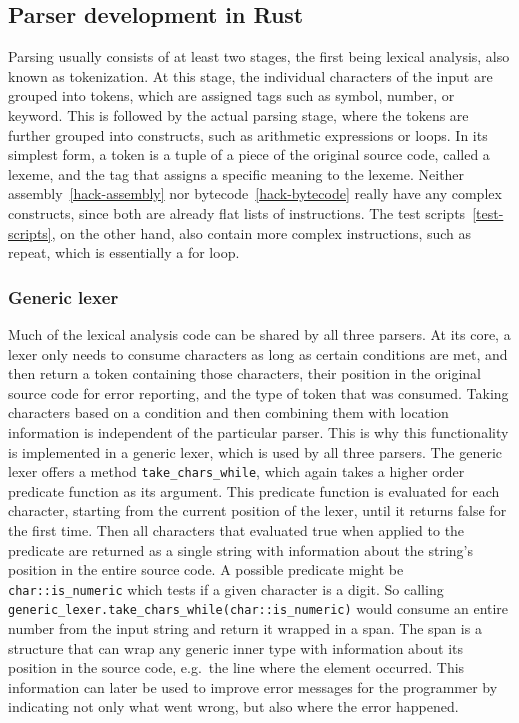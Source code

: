 \subsection{Parser development in Rust} \label{parser-dev}
Parsing usually consists of at least two stages, the first being lexical analysis, also known as tokenization.
At this stage, the individual characters of the input are grouped into tokens, which are assigned tags such as symbol, number, or keyword.
This is followed by the actual parsing stage, where the tokens are further grouped into constructs, such as arithmetic expressions or loops.
In its simplest form, a token is a tuple of a piece of the original source code, called a lexeme, and the tag that assigns a specific meaning to the lexeme.
Neither assembly~\ref{hack-assembly} nor bytecode~\ref{hack-bytecode} really have any complex constructs, since both are already flat lists of instructions.
The test scripts~\ref{test-scripts}, on the other hand, also contain more complex instructions, such as repeat, which is essentially a for loop.

\subsubsection{Generic lexer}
Much of the lexical analysis code can be shared by all three parsers.
At its core, a lexer only needs to consume characters as long as certain conditions are met, and then return a token containing those characters, their position in the original source code for error reporting, and the type of token that was consumed.
Taking characters based on a condition and then combining them with location information is independent of the particular parser.
This is why this functionality is implemented in a generic lexer, which is used by all three parsers.
The generic lexer offers a method \verb+take_chars_while+, which again takes a higher order predicate function as its argument.
This predicate function is evaluated for each character, starting from the current position of the lexer, until it returns false for the first time.
Then all characters that evaluated true when applied to the predicate are returned as a single string with information about the string's position in the entire source code.
A possible predicate might be \verb+char::is_numeric+ which tests if a given character is a digit.
So calling \verb+generic_lexer.take_chars_while(char::is_numeric)+ would consume an entire number from the input string and return it wrapped in a span.
\label{spans}
The span is a structure that can wrap any generic inner type with information about its position in the source code, e.g.\ the line where the element occurred.
This information can later be used to improve error messages for the programmer by indicating not only what went wrong, but also where the error happened.

